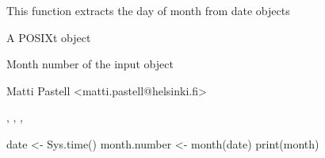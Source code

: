 \begin{Description}\relax
This function extracts the day of month from date objects
\end{Description}
\begin{Arguments}
\begin{ldescription}
\item[\code{x}] A POSIXt object
\end{ldescription}
\end{Arguments}
\begin{Value}
\begin{ldescription}
\item[\code{month}] Month number of the input object
\end{ldescription}
\end{Value}
\begin{Author}\relax
Matti Pastell <matti.pastell@helsinki.fi>
\end{Author}
\begin{SeeAlso}\relax
{}, ,
,
\end{SeeAlso}
\begin{Examples}
\begin{ExampleCode}
date <- Sys.time()
month.number <- month(date)
print(month)
\end{ExampleCode}
\end{Examples}

